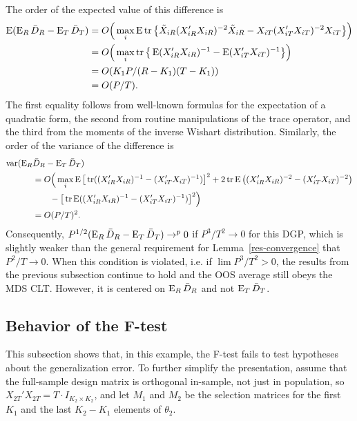 The order of the expected value of this difference is
\begin{equation*}
  \begin{split}
  \operatorname{E}(\operatorname{E}_R \bar{D}_{R} - \operatorname{E}_T \bar{D}_{T})
      &=O\Big(\max_i \operatorname{E} \operatorname{tr} \big\{
        \tilde{X}_{iR}(X_{iR}'X_{iR})^{-2} \tilde{X}_{iR}
        - X_{iT}(X_{iT}'X_{iT})^{-2} X_{iT} \big\} \Big) \\
      &=O\Big(\max_i \operatorname{tr} \big\{\operatorname{E} (X_{iR}'X_{iR})^{-1}
         - \operatorname{E} (X_{iT}'X_{iT})^{-1} \big\}\Big) \\
      &=O( K_1 P / (R-K_1)(T-K_1)) \\
      &=O(P/T).
    \end{split}
\end{equation*}
The first equality follows from well-known formulas for the
expectation of a quadratic form, the second from routine manipulations
of the trace operator, and the third from the moments of the inverse
Wishart distribution.
Similarly, the order of the variance of the difference is
\begin{align*}
  \operatorname{var}(\operatorname{E}_R & \bar{D}_{R} - \operatorname{E}_T \bar{D}_{T}) \\ &=
  O\Big(\max_i \operatorname{E}\big[\operatorname{tr}((X_{iR}'X_{iR})^{-1} - (X_{iT}'X_{iT})^{-1})\big]^2
  + 2 \operatorname{tr} \operatorname{E}\big((X_{iR}'X_{iR})^{-2} - (X_{iT}'X_{iT})^{-2}\big) \\
  &\qquad - \big[\operatorname{tr} \operatorname{E}((X_{iR}'X_{iR})^{-1} - (X_{iT}'X_{iT})^{-1}) \big]^2 \Big)\\
  &= O(P/T)^2.
\end{align*}
Consequently, $P^{1/2}(\operatorname{E}_R \bar{D}_{R} - \operatorname{E}_T \bar{D}_{T}) \to^p 0$ if
$P^3/T^2 \to 0$ for this DGP, which is slightly weaker than the
general requirement for Lemma~\ref{res-convergence} that
$P^2/T \to 0$. When this condition is violated, i.e. if
$\lim P^3/T^2 > 0$, the results from the previous subsection continue
to hold and the OOS average still obeys the MDS CLT. However, it is
centered on $\operatorname{E}_R \bar{D}_{R}$ and not $\operatorname{E}_T \bar{D}_{T}$.

\subsection{Behavior of the F-test}

This subsection shows that, in this example, the F-test fails to test
hypotheses about the generalization error.
To further simplify the presentation, assume that the full-sample
design matrix is orthogonal in-sample, not just in population, so
$X_{2T}'X_{2T} = T \cdot I_{K_2 \times K_2}$, and let $M_1$ and
$M_2$ be the selection matrices for the first $K_1$ and the last
$K_2-K_1$ elements of $\theta_2$.

